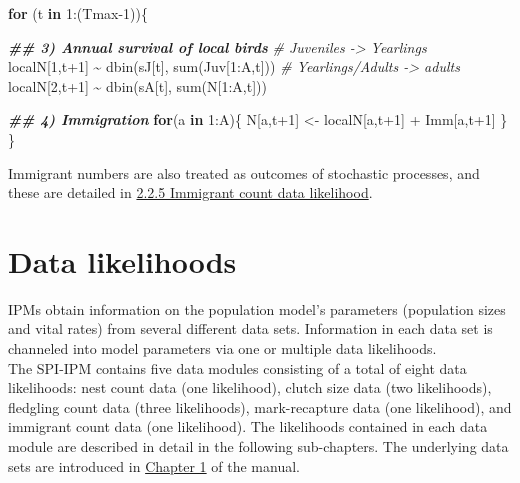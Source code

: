 \documentclass[
]{book}
\newenvironment{Shaded}{\begin{snugshade}}{\end{snugshade}}
\newcommand{\CommentTok}[1]{\textcolor[rgb]{0.56,0.35,0.01}{\textit{#1}}}
\newcommand{\ControlFlowTok}[1]{\textcolor[rgb]{0.13,0.29,0.53}{\textbf{#1}}}
\newcommand{\DecValTok}[1]{\textcolor[rgb]{0.00,0.00,0.81}{#1}}
\newcommand{\DocumentationTok}[1]{\textcolor[rgb]{0.56,0.35,0.01}{\textbf{\textit{#1}}}}
\newcommand{\FunctionTok}[1]{\textcolor[rgb]{0.00,0.00,0.00}{#1}}
\newcommand{\NormalTok}[1]{#1}
\newcommand{\OtherTok}[1]{\textcolor[rgb]{0.56,0.35,0.01}{#1}}
\newcommand{\SpecialCharTok}[1]{\textcolor[rgb]{0.00,0.00,0.00}{#1}}
\begin{document}
\begin{Shaded}
\begin{Highlighting}[]
\ControlFlowTok{for}\NormalTok{ (t }\ControlFlowTok{in} \DecValTok{1}\SpecialCharTok{:}\NormalTok{(Tmax}\DecValTok{{-}1}\NormalTok{))\{}
  
  \DocumentationTok{\#\# 3) Annual survival of local birds}
  \CommentTok{\# Juveniles {-}\textgreater{} Yearlings}
\NormalTok{  localN[}\DecValTok{1}\NormalTok{,t}\SpecialCharTok{+}\DecValTok{1}\NormalTok{] }\SpecialCharTok{\textasciitilde{}} \FunctionTok{dbin}\NormalTok{(sJ[t], }\FunctionTok{sum}\NormalTok{(Juv[}\DecValTok{1}\SpecialCharTok{:}\NormalTok{A,t]))}
  \CommentTok{\# Yearlings/Adults {-}\textgreater{} adults}
\NormalTok{  localN[}\DecValTok{2}\NormalTok{,t}\SpecialCharTok{+}\DecValTok{1}\NormalTok{] }\SpecialCharTok{\textasciitilde{}} \FunctionTok{dbin}\NormalTok{(sA[t], }\FunctionTok{sum}\NormalTok{(N[}\DecValTok{1}\SpecialCharTok{:}\NormalTok{A,t]))}
  
  \DocumentationTok{\#\# 4) Immigration}
  \ControlFlowTok{for}\NormalTok{(a }\ControlFlowTok{in} \DecValTok{1}\SpecialCharTok{:}\NormalTok{A)\{}
\NormalTok{    N[a,t}\SpecialCharTok{+}\DecValTok{1}\NormalTok{] }\OtherTok{\textless{}{-}}\NormalTok{ localN[a,t}\SpecialCharTok{+}\DecValTok{1}\NormalTok{] }\SpecialCharTok{+}\NormalTok{ Imm[a,t}\SpecialCharTok{+}\DecValTok{1}\NormalTok{]}
\NormalTok{  \}}
\NormalTok{\}}
\end{Highlighting}
\end{Shaded}

Immigrant numbers are also treated as outcomes of stochastic processes, and
these are detailed in \protect\hyperlink{ux5cux23ux5cux23ux5cux2520Immigrantux5cux2520countux5cux2520dataux5cux2520likelihood}{2.2.5 Immigrant count data likelihood}.

\hypertarget{data-likelihoods}{%
\section{Data likelihoods}\label{data-likelihoods}}

IPMs obtain information on the population model's parameters (population sizes
and vital rates) from several different data sets. Information in each data set
is channeled into model parameters via one or multiple data likelihoods.\\
The SPI-IPM contains five data modules consisting of a total of eight data
likelihoods: nest count data (one likelihood), clutch size data (two likelihoods),
fledgling count data (three likelihoods), mark-recapture data (one likelihood),
and immigrant count data (one likelihood).
The likelihoods contained in each data module are described in detail in the
following sub-chapters. The underlying data sets are introduced in
\protect\hyperlink{DataPrep}{Chapter 1} of the manual.
\end{document}
